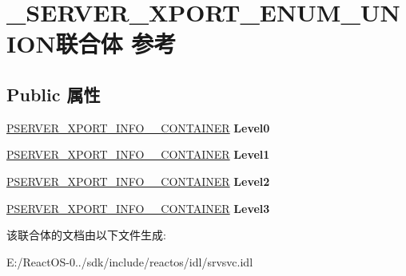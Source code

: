 \hypertarget{union___s_e_r_v_e_r___x_p_o_r_t___e_n_u_m___u_n_i_o_n}{}\section{\+\_\+\+S\+E\+R\+V\+E\+R\+\_\+\+X\+P\+O\+R\+T\+\_\+\+E\+N\+U\+M\+\_\+\+U\+N\+I\+O\+N联合体 参考}
\label{union___s_e_r_v_e_r___x_p_o_r_t___e_n_u_m___u_n_i_o_n}
\subsection*{Public 属性}
\begin{DoxyCompactItemize}
\item 
\mbox{\label{union___s_e_r_v_e_r___x_p_o_r_t___e_n_u_m___u_n_i_o_n_ada0d0f031c126005fbd7c4a7ce3da06f}} 
\hyperlink{struct___s_e_r_v_e_r___x_p_o_r_t___i_n_f_o__0___c_o_n_t_a_i_n_e_r}{P\+S\+E\+R\+V\+E\+R\+\_\+\+X\+P\+O\+R\+T\+\_\+\+I\+N\+F\+O\+\_\+\_\+\+C\+O\+N\+T\+A\+I\+N\+ER} {\bfseries Level0}
\item 
\mbox{\label{union___s_e_r_v_e_r___x_p_o_r_t___e_n_u_m___u_n_i_o_n_a01ec7b9bee22d13d6ca82b32a3f9232d}} 
\hyperlink{struct___s_e_r_v_e_r___x_p_o_r_t___i_n_f_o__1___c_o_n_t_a_i_n_e_r}{P\+S\+E\+R\+V\+E\+R\+\_\+\+X\+P\+O\+R\+T\+\_\+\+I\+N\+F\+O\+\_\+\_\+\+C\+O\+N\+T\+A\+I\+N\+ER} {\bfseries Level1}
\item 
\mbox{\label{union___s_e_r_v_e_r___x_p_o_r_t___e_n_u_m___u_n_i_o_n_a93f3a1fae5ff26747deced2e59b2c483}} 
\hyperlink{struct___s_e_r_v_e_r___x_p_o_r_t___i_n_f_o__2___c_o_n_t_a_i_n_e_r}{P\+S\+E\+R\+V\+E\+R\+\_\+\+X\+P\+O\+R\+T\+\_\+\+I\+N\+F\+O\+\_\+\_\+\+C\+O\+N\+T\+A\+I\+N\+ER} {\bfseries Level2}
\item 
\mbox{\label{union___s_e_r_v_e_r___x_p_o_r_t___e_n_u_m___u_n_i_o_n_a7f0af353e3f023899ea70b2f808733a9}} 
\hyperlink{struct___s_e_r_v_e_r___x_p_o_r_t___i_n_f_o__3___c_o_n_t_a_i_n_e_r}{P\+S\+E\+R\+V\+E\+R\+\_\+\+X\+P\+O\+R\+T\+\_\+\+I\+N\+F\+O\+\_\+\_\+\+C\+O\+N\+T\+A\+I\+N\+ER} {\bfseries Level3}
\end{DoxyCompactItemize}


该联合体的文档由以下文件生成\+:\begin{DoxyCompactItemize}
\item 
E\+:/\+React\+O\+S-\/0../sdk/include/reactos/idl/srvsvc.\+idl\end{DoxyCompactItemize}
